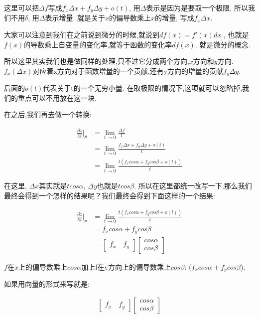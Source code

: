 这里可以把$\Delta f$写成$f_x\Delta x + f_y \Delta y + o(t)$, 用$\Delta$表示是因为是要取一个极限, 所以我们不用$\delta$, 用$\Delta$表示增量. 就是关于$x$的偏导数乘上$x$的增量, 写成$f_x\Delta x$. 

大家可以注意到我们在之前说到微分的时候,就说到$df(x) = f'(x)dx$ , 也就是$f(x)$的导数乘上自变量的变化率,就等于函数的变化率$df(x)$. 就是微分的概念. 

所以这里其实我们也是做同样的处理,只不过它分成两个方向,$x$方向和$y$方向. $f_x(\Delta x)$对应着x方向对于函数增量的一个贡献,还有y方向的增量的贡献$f_y \Delta y$.  

后面的$o(t)$代表关于t的一个无穷小量. 在取极限的情况下,这项就可以忽略掉,我们的重点可以不用放在这一块. 

在之后,我们再去做一个转换:

\begin{align*}
  \frac{\partial z}{\partial l} \Bigg \vert _p & = \lim_{t \to 0}\frac{\Delta f}{t} \\
  & = \lim_{t \to 0} \frac{f_x\Delta x + f_y \Delta y + o(t)}{t} \\
  & = \lim_{t \to 0} \frac{t(f_xcos \alpha + f_y cos\beta + o(t))}{t} 
\end{align*}

在这里, $\Delta x$其实就是$t cos \alpha$, $\Delta y$也就是$t cos \beta$. 所以在这里都统一改写一下,那么我们最终会得到一个怎样的结果呢？我们最终会得到下面这样的一个结果: 

\begin{align*}
  \frac{\partial z}{\partial l} \Bigg \vert _p & = \lim_{t \to 0} \frac{t(f_xcos \alpha + f_y cos\beta + o(t))}{t} \\
  & = f_x cos \alpha + f_y cos \beta \\
  & = \begin{bmatrix} f_x \quad f_y  \end{bmatrix} \begin{bmatrix} cos  \alpha \\ cos \beta \end{bmatrix}
\end{align*}

$f$在$x$上的偏导数乘上$cos \alpha$加上f在y方向上的偏导数乘上$cos\beta$: ($f_x cos \alpha + f_y cos \beta $). 

如果用向量的形式来写就是: 

\begin{align*}
  \begin{bmatrix} f_x \quad f_y  \end{bmatrix}
  \begin{bmatrix} cos \alpha \\ cos \beta \end{bmatrix}
\end{align*}

